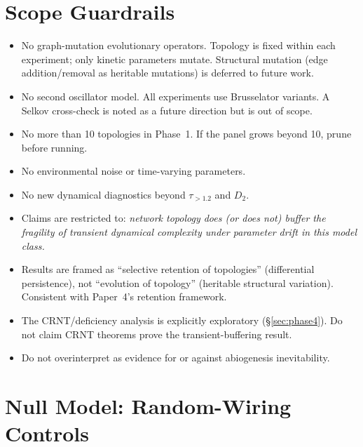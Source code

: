 \documentclass[aps,prl,twocolumn,superscriptaddress,floatfix]{revtex4-2}
\newcommand{\tauexp}{\tau_{>1.2}}
\newcommand{\Dtwo}{D_2}
\begin{document}
\section{Scope Guardrails}

\begin{itemize}
  \item No graph-mutation evolutionary operators.  Topology is
    fixed within each experiment; only kinetic parameters mutate.
    Structural mutation (edge addition/removal as heritable
    mutations) is deferred to future work.

  \item No second oscillator model.  All experiments use
    Brusselator variants.  A Selkov cross-check is noted as a
    future direction but is out of scope.

  \item No more than 10 topologies in Phase~1.  If the panel
    grows beyond 10, prune before running.

  \item No environmental noise or time-varying parameters.

  \item No new dynamical diagnostics beyond $\tauexp$ and $\Dtwo$.

  \item Claims are restricted to: \emph{network topology does
    (or does not) buffer the fragility of transient dynamical
    complexity under parameter drift in this model class.}

  \item Results are framed as ``selective retention of topologies''
    (differential persistence), not ``evolution of topology''
    (heritable structural variation).  Consistent with Paper~4's
    retention framework.

  \item The CRNT/deficiency analysis is explicitly exploratory
    (\S\ref{sec:phase4}).  Do not claim CRNT theorems prove
    the transient-buffering result.

  \item Do not overinterpret as evidence for or against
    abiogenesis inevitability.
\end{itemize}

\section{Null Model: Random-Wiring Controls}
\end{document}
